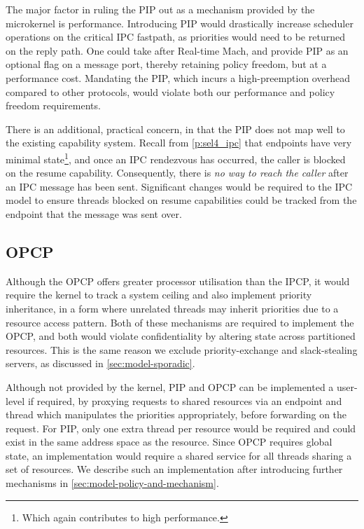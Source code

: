 The major factor in ruling the \gls{PIP} out as a mechanism provided by the microkernel is
performance. Introducing \gls{PIP} would drastically increase scheduler operations on the critical
\gls{IPC} fastpath, as priorities would need to be returned on the reply path. One could take after
Real-time Mach, and provide \gls{PIP} as an optional flag on a message port, thereby retaining
policy freedom, but at a performance cost. Mandating the \gls{PIP}, which incurs a high-preemption
overhead compared to other protocols, would violate both our performance and policy freedom
requirements. 

There is an additional, practical concern, in that the \gls{PIP} does not map well to the existing
capability system. Recall from \cref{p:sel4_ipc} that endpoints have very minimal state\footnote{Which
again contributes to high performance.}, and once an IPC rendezvous has occurred, the caller is
blocked on the resume capability. Consequently, there is \emph{no way to reach the caller} after an 
\gls{IPC} message has been sent. 
Significant changes would be required to the \gls{IPC} model to ensure threads
blocked on resume capabilities could be tracked from the endpoint that the message was sent over.



\subsection{\gls{OPCP}}

Although the \gls{OPCP} offers greater processor utilisation than the \gls{IPCP}, it would require the
kernel to track a system ceiling and also implement priority inheritance, in a form where unrelated
threads may inherit priorities due to a resource access pattern. Both of these mechanisms are
required to implement the \gls{OPCP}, and both would violate confidentiality by altering state 
across partitioned resources.  This is the same reason we exclude
priority-exchange and slack-stealing servers, as discussed in \cref{sec:model-sporadic}.

Although not provided by the kernel, \gls{PIP} and \gls{OPCP} can be implemented a user-level if
required, by proxying requests to shared resources via an endpoint and thread which manipulates the priorities
appropriately, before forwarding on the request. For \gls{PIP}, only one extra thread per resource would 
be required and could exist in the same address space as the resource.
Since \gls{OPCP} requires global state, an implementation would require a shared service for all threads 
sharing a set of resources. We describe such an implementation after introducing further mechanisms
in \cref{sec:model-policy-and-mechanism}.

